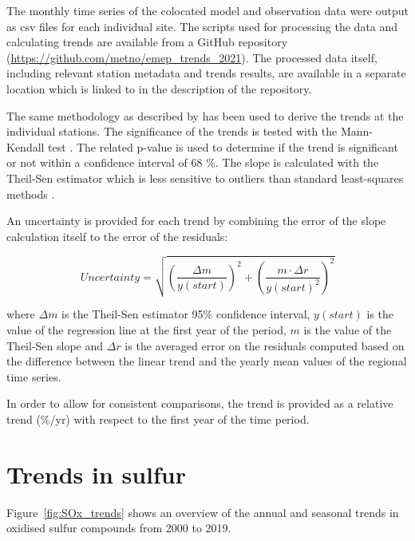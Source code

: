 The monthly time series of the colocated model and observation data were output as csv files for each individual site. The scripts used for processing the data and calculating trends are available from a GitHub repository (\url{https://github.com/metno/emep_trends_2021}). The processed data itself, including relevant station metadata and trends results, are available in a separate location which is linked to in the description of the repository.

The same methodology as described by \cite{aas2019global, mortier2020} has been used to derive the trends at the individual stations. The significance of the trends is tested with the Mann-Kendall test \citep{hamed1998modified}. The related p-value is used to determine if the trend is significant or not within a confidence interval of 68 \%. The slope is calculated with the Theil-Sen estimator which is less sensitive to outliers than standard least-squares methods \citep{sen1968estimates}.

An uncertainty is provided for each trend by combining the error of the slope calculation itself to the error of the residuals:

\begin{equation}
 Uncertainty = \sqrt{{\left (\frac{\Delta m}{y(start)}\right )}^{2} + {\left ( \frac{m \cdot \Delta r}{y(start)^2}\right )}^{2} }
\end{equation}

where $\Delta m$ is the Theil-Sen estimator 95\% confidence interval, $y(start)$ is the value of the regression line at the first year of the period, $m$ is the value of the Theil-Sen slope and $\Delta r$ is the averaged error on the residuals computed based on the difference between the linear trend and the yearly mean values of the regional time series.

In order to allow for consistent comparisons, the trend is provided as a relative trend (\%/yr) with respect to the first year of the time period.



\section{\label{sec:Trends_sulfur}Trends in sulfur}

Figure~\ref{fig:SOx_trends} shows an overview of the annual and seasonal trends in oxidised sulfur compounds from 2000 to 2019.

